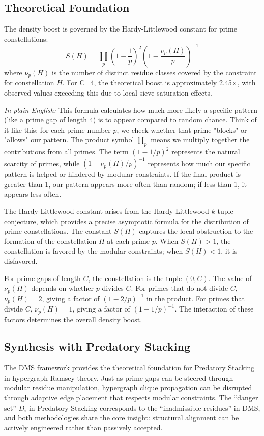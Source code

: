 \documentclass[12pt]{article}
\begin{document}
\subsection{Theoretical Foundation}
The density boost is governed by the Hardy-Littlewood constant for prime constellations:
\begin{equation}
S(H) = \prod_p \left(1 - \frac{1}{p}\right)^2 \left(1 - \frac{\nu_p(H)}{p}\right)^{-1}
\end{equation}
where $\nu_p(H)$ is the number of distinct residue classes covered by the constraint for constellation $H$. For C=4, the theoretical boost is approximately 2.45×, with observed values exceeding this due to local sieve saturation effects.

\textit{In plain English:} This formula calculates how much more likely a specific pattern (like a prime gap of length 4) is to appear compared to random chance. Think of it like this: for each prime number $p$, we check whether that prime "blocks" or "allows" our pattern. The product symbol $\prod_p$ means we multiply together the contributions from all primes. The term $(1 - 1/p)^2$ represents the natural scarcity of primes, while $(1 - \nu_p(H)/p)^{-1}$ represents how much our specific pattern is helped or hindered by modular constraints. If the final product is greater than 1, our pattern appears more often than random; if less than 1, it appears less often.

The Hardy-Littlewood constant arises from the Hardy-Littlewood $k$-tuple conjecture, which provides a precise asymptotic formula for the distribution of prime constellations. The constant $S(H)$ captures the local obstruction to the formation of the constellation $H$ at each prime $p$. When $S(H) > 1$, the constellation is favored by the modular constraints; when $S(H) < 1$, it is disfavored.

For prime gaps of length $C$, the constellation is the tuple $(0, C)$. The value of $\nu_p(H)$ depends on whether $p$ divides $C$. For primes that do not divide $C$, $\nu_p(H) = 2$, giving a factor of $(1 - 2/p)^{-1}$ in the product. For primes that divide $C$, $\nu_p(H) = 1$, giving a factor of $(1 - 1/p)^{-1}$. The interaction of these factors determines the overall density boost.

\subsection{Synthesis with Predatory Stacking}
The DMS framework provides the theoretical foundation for Predatory Stacking in hypergraph Ramsey theory. Just as prime gaps can be steered through modular residue manipulation, hypergraph clique propagation can be disrupted through adaptive edge placement that respects modular constraints. The ``danger set'' $D_i$ in Predatory Stacking corresponds to the ``inadmissible residues'' in DMS, and both methodologies share the core insight: structural alignment can be actively engineered rather than passively accepted.
\end{document}
